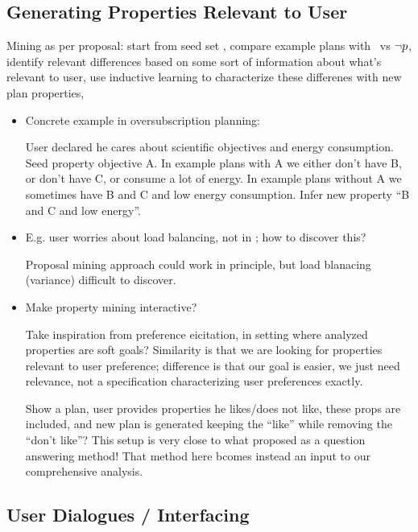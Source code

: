 \subsection{Generating Properties Relevant to User}

Mining as per proposal: start from seed set \props, compare example
plans with \prop\ vs $\neg p$, identify relevant differences based
on some sort of information about what's relevant to user, use
inductive learning to characterize these differenes with new plan
properties,

\begin{itemize}
\item Concrete example in oversubscription planning:

  User declared he cares about scientific objectives and energy
  consumption. Seed property objective A. In example plans with A we
  either don't have B, or don't have C, or consume a lot of energy. In
  example plans without A we sometimes have B and C and low energy
  consumption. Infer new property ``B and C and low energy''.

\item E.g. user worries about load balancing, not in \props; how to
  discover this?

  Proposal mining approach could work in principle, but load blanacing
  (variance) difficult to discover.

\item Make property mining interactive?

  Take inspiration from preference eicitation, in setting where
  analyzed properties are soft goals? Similarity is that we are
  looking for properties relevant to user preference; difference is
  that our goal is easier, we just need relevance, not a specification
  characterizing user preferences exactly.

   Show a plan, user provides
  properties he likes/does not like, these props are included, and new
  plan is generated keeping the ``like'' while removing the ``don't
  like''?  This setup is very close to what
  \cite{fox:etal:ijcai-ws-17} proposed as a question answering method!
  That method here bcomes instead an input to our comprehensive
  analysis. 

\end{itemize}





\subsection{User Dialogues / Interfacing}

